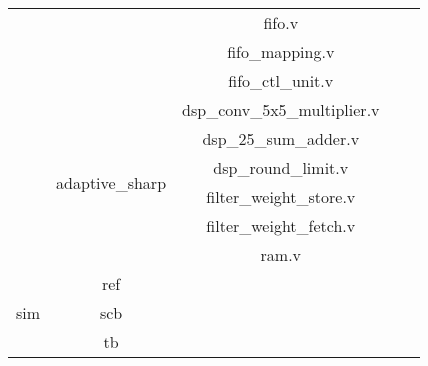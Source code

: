 \begin{table}[htb]
\begin{tabular}{|c|c|c|ll}
                          &                                       & fifo.v                              &  &  \\ \cline{3-3}
                          &                                       & fifo\_mapping.v                     &  &  \\ \cline{3-3}
                          &                                       & fifo\_ctl\_unit.v                   &  &  \\ \cline{2-3}
                          & \multirow{6}{*}{adaptive\_sharp}      & dsp\_conv\_5x5\_multiplier.v        &  &  \\ \cline{3-3}
                          &                                       & dsp\_25\_sum\_adder.v               &  &  \\ \cline{3-3}
                          &                                       & dsp\_round\_limit.v                 &  &  \\ \cline{3-3}
                          &                                       & filter\_weight\_store.v             &  &  \\ \cline{3-3}
                          &                                       & filter\_weight\_fetch.v             &  &  \\ \cline{3-3}
                          &                                       & ram.v                               &  &  \\ \cline{1-3}
    \multirow{3}{*}{sim}  & ref                                   &                                     &  &  \\ \cline{2-3}
                          & scb                                   &                                     &  &  \\ \cline{2-3}
                          & tb                                    &                                     &  &  \\ \cline{1-3}
    \end{tabular}
    \end{table}